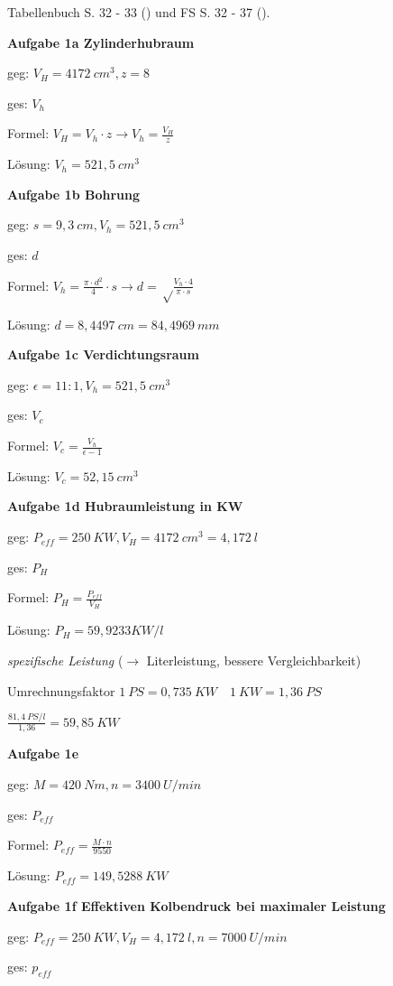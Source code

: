Tabellenbuch S. 32 - 33 (\textcite{bell:2021:tabellenbuchKfz}) und FS S. 32
- 37 (\textcite{bell:2020:formelsammlung}).

\textbf{Aufgabe 1a Zylinderhubraum}

geg: $V_H = 4172~cm^3, z = 8$

ges: $V_h$

Formel: $V_H = V_h \cdot z \to V_h = \frac{V_H}{z}$

Lösung: $V_h = 521,5~cm^3$

\textbf{Aufgabe 1b Bohrung}

geg: $s = 9,3~cm, V_h = 521,5~cm^3$

ges: $d$

Formel:
$V_h = \frac{\pi \cdot d^2}{4} \cdot s \to d = \sqrt\frac{V_h \cdot 4}{\pi \cdot s}$

Lösung: $d = 8,4497~cm = 84,4969~mm$

\textbf{Aufgabe 1c Verdichtungsraum}

geg: $\epsilon = 11 : 1, V_h = 521,5~cm^3$

ges: $V_c$

Formel: $V_c = \frac{V_h}{\epsilon - 1}$

Lösung: $V_c = 52,15~cm^3$

\textbf{Aufgabe 1d Hubraumleistung in KW}

geg: $P_{eff} = 250~KW, V_H = 4172~cm^3 = 4,172~l$

ges: $P_H$

Formel: $P_H = \frac{P_{eff}}{V_H}$

Lösung: $P_H = 59,9233 KW/l$

\emph{spezifische Leistung} ($\to$ Literleistung, bessere
Vergleichbarkeit)

Umrechnungsfaktor $\boxed{1~PS = 0,735~KW \quad 1~KW = 1,36~PS}$

$\frac{81,4~PS/l}{1,36} = 59,85~KW$

\textbf{Aufgabe 1e}

geg: $M = 420~Nm, n = 3400~U/min$

ges: $P_{eff}$

Formel: $P_{eff} = \frac{M \cdot n}{9550}$

Lösung: $P_{eff} = 149,5288~KW$

\textbf{Aufgabe 1f Effektiven Kolbendruck bei maximaler Leistung}

geg: $P_{eff} = 250~KW, V_H = 4,172~l, n = 7000~U/min$

ges: $p_{eff}$

